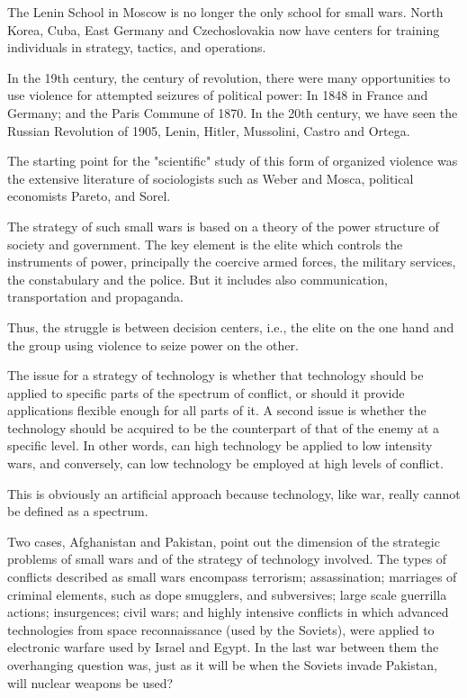 The Lenin School in Moscow is no longer the only school for small wars. North Korea, Cuba, East Germany and Czechoslovakia now have centers for training individuals in strategy, tactics, and operations.

In the 19th century, the century of revolution, there were many opportunities to use violence for attempted seizures of political power: In 1848 in France and Germany; and the Paris Commune of 1870. In the 20th century, we have seen the Russian Revolution of 1905, Lenin, Hitler, Mussolini, Castro and Ortega.

The starting point for the "scientific" study of this form of organized violence was the extensive literature of sociologists such as Weber and Mosca, political economists Pareto, and Sorel.

The strategy of such small wars is based on a theory of the power structure of society and government. The key element is the elite which controls the instruments of power, principally the coercive armed forces, the military services, the constabulary and the police. But it includes also communication, transportation and propaganda.

Thus, the struggle is between decision centers, i.e., the elite on the one hand and the group using violence to seize power on the other.

The issue for a strategy of technology is whether that technology should be applied to specific parts of the spectrum of conflict, or should it provide applications flexible enough for all parts of it. A second issue is whether the technology should be acquired to be the counterpart of that of the enemy at a specific level. In other words, can high technology be applied to low intensity wars, and conversely, can low technology be employed at high levels of conflict.

This is obviously an artificial approach because technology, like war, really cannot be defined as a spectrum.

Two cases, Afghanistan and Pakistan, point out the dimension of the strategic problems of small wars and of the strategy of technology involved. The types of conflicts described as small wars encompass terrorism; assassination; marriages of criminal elements, such as dope smugglers, and subversives; large scale guerrilla actions; insurgences; civil wars; and highly intensive conflicts in which advanced technologies from space reconnaissance (used by the Soviets), were applied to electronic warfare used by Israel and Egypt. In the last war between them the overhanging question was, just as it will be when the Soviets invade Pakistan, will nuclear weapons be used?

